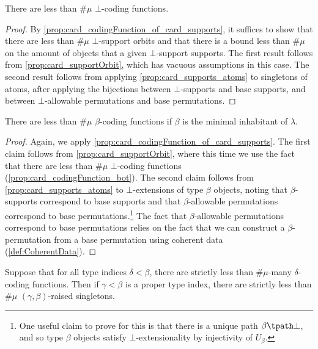 \begin{proposition}
  \label{prop:card_codingFunction_bot}
  There are less than \( \#\mu \) \( \bot \)-coding functions.
\end{proposition}
\begin{proof}
  By \cref{prop:card_codingFunction_of_card_supports}, it suffices to show that there are less than \( \#\mu \) \( \bot \)-support orbits and that there is a bound less than \( \#\mu \) on the amount of objects that a given \( \bot \)-support supports.
  The first result follows from \cref{prop:card_supportOrbit}, which has vacuous assumptions in this case.
  The second result follows from applying \cref{prop:card_supports_atoms} to singletons of atoms, after applying the bijections between \( \bot \)-supports and base supports, and between \( \bot \)-allowable permutations and base permutations.
\end{proof}
\begin{proposition}
  \label{prop:card_codingFunction_min}
  There are less than \( \#\mu \) \( \beta \)-coding functions if \( \beta \) is the minimal inhabitant of \( \lambda \).
\end{proposition}
\begin{proof}
  Again, we apply \cref{prop:card_codingFunction_of_card_supports}.
  The first claim follows from \cref{prop:card_supportOrbit}, where this time we use the fact that there are less than \( \#\mu \) \( \bot \)-coding functions (\cref{prop:card_codingFunction_bot}).
  The second claim follows from \cref{prop:card_supports_atoms} to \( \bot \)-extensions of type \( \beta \) objects, noting that \( \beta \)-supports correspond to base supports and that \( \beta \)-allowable permutations correspond to base permutations.\footnote{One useful claim to prove for this is that there is a unique path \( \beta \tpath \bot \), and so type \( \beta \) objects satisfy \( \bot \)-extensionality by injectivity of \( U_\beta \).}
  The fact that \( \beta \)-allowable permutations correspond to base permutations relies on the fact that we can construct a \( \beta \)-permutation from a base permutation using coherent data (\cref{def:CoherentData}).
\end{proof}
\begin{proposition}
  \label{prop:card_raisedSingleton}
  Suppose that for all type indices \( \delta < \beta \), there are strictly less than \( \#\mu \)-many \( \delta \)-coding functions.
  Then if \( \gamma < \beta \) is a proper type index, there are strictly less than \( \#\mu \) \( (\gamma,\beta) \)-raised singletons.
\end{proposition}
